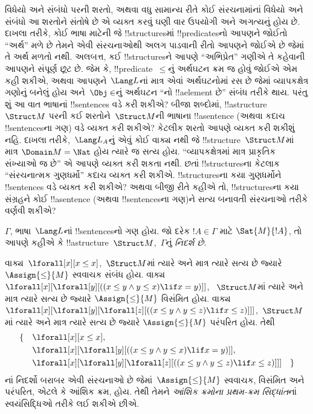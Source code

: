 \documentclass[../../../include/open-logic-section]{subfiles}
\begin{document}


\begin{explain}
વિધેયો અને સંબંધો પરની શરતો, અથવા વધુ સામાન્ય રીતે કોઈ સંરચનામાંનાં
વિધેયો અને સંબંધો આ શરતોને સંતોષે છે એ વ્યક્ત કરવું ઘણી વાર ઉપયોગી અને
અગત્યનું હોય છે. દાખલા તરીકે, કોઈ ભાષા માટેની જે !!{structure}sમાં
!!{predicate}sનો આપણને જોઈતો ``અર્થ'' મળે છે તેમને એવી
સંરચનાઓથી અલગ પાડવાની રીતો આપણને જોઈએ છે જેમાં તે અર્થ મળતો
નથી. અલબત્ત, કઈ !!{structure}sને આપણે ``અભિપ્રેત'' ગણીએ તે કહેવાની
આપણને સંપૂર્ણ છૂટ છે. જેમ કે, !!{predicate}~$\le$નું અર્થઘટન ક્રમ જ
હોવું જોઈએ એમ કહી શકીએ, અથવા આપણને~$\Lang L$નાં માત્ર એવાં અર્થઘટનોમાં
રસ છે જેમાં વ્યાપકક્ષેત્ર ગણોનું બનેલું હોય અને~$\Obj \in$નું
અર્થઘટન ``નો !!a{element} છે'' સંબંધ તરીકે થાય. પરંતુ શું આ વાત ભાષાનાં
!!{sentence}s વડે કરી શકીએ? બીજા શબ્દોમાં, !!a{structure}~$\Struct M$
પરની કઈ શરતોને~$\Struct M$ની ભાષાના !!a{sentence} (અથવા કદાચ
!!{sentence}sના ગણ) વડે વ્યક્ત કરી શકીએ? કેટલીક શરતો આપણે વ્યક્ત કરી
શકીશું નહિ. દાખલા તરીકે,~$\Lang L_A$નું એવું કોઈ વાક્ય નથી જે
!!{structure}~$\Struct M$માં માત્ર $\Domain M=\Nat$ હોય ત્યારે જ સત્ય
હોય. ``વ્યાપકક્ષેત્રમાં માત્ર પ્રાકૃતિક સંખ્યાઓ જ છે'' એ આપણે વ્યક્ત
કરી શકતા નથી. છતાં !!{structure}sના કેટલાક ``સંરચનાત્મક ગુણધર્મો''
કદાચ વ્યક્ત કરી શકીએ. !!{structure}sના કયા ગુણધર્મોને !!{sentence}s
વડે વ્યક્ત કરી શકીએ? અથવા બીજી રીતે કહીએ તો, !!{structure}sના કયા
સંગ્રહને કોઈ !!a{sentence} (અથવા !!{sentence}sના ગણ)ને સત્ય બનાવતી
સંરચનાઓ તરીકે વર્ણવી શકીએ?
\end{explain}

\begin{defn}[ગણનું નિદર્શ]
$\Gamma$, ભાષા~$\Lang L$નાં !!{sentence}sનો ગણ હોય. જો દરેક
$!A\in\Gamma$ માટે $\Sat{M}{!A}$, તો આપણે કહીએ કે
!!a{structure}~$\Struct M$,~$\Gamma$નું \emph{નિદર્શ છે}.
\end{defn}

\begin{ex}
વાક્ય~$\lforall[x][x \le x]$,~$\Struct M$માં ત્યારે અને માત્ર ત્યારે
સત્ય છે જ્યારે $\Assign{\le}{M}$ સ્વવાચક સંબંધ હોય. વાક્ય
$\lforall[x][\lforall[y][((x \le y \land y \le x) \lif x = y)]]$,
~$\Struct M$માં ત્યારે અને માત્ર ત્યારે સત્ય છે જ્યારે
$\Assign{\le}{M}$ વિસંમિત હોય. વાક્ય
$\lforall[x][\lforall[y][\lforall[z][((x \le y \land y \le z)
      \lif x \le z)]]]$,~$\Struct M$માં ત્યારે અને માત્ર ત્યારે સત્ય
છે જ્યારે $\Assign{\le}{M}$ પરંપરિત હોય. તેથી
\begin{align*}
\{\quad &\lforall[x][x \le x], \\
   & \lforall[x][\lforall[y][((x \le y \land y \le
    x) \lif x = y)]], \\
   &\lforall[x][\lforall[y][\lforall[z][((x \le y
      \land y \le z) \lif x \le z)]]] \quad \}
\end{align*}
નાં નિદર્શો બરાબર એવી સંરચનાઓ છે જેમાં~$\Assign{\le}{M}$ સ્વવાચક,
વિસંમિત અને પરંપરિત, એટલે કે આંશિક ક્રમ, હોય. તેથી તેમને
\emph{આંશિક ક્રમોના પ્રથમ-ક્રમ સિદ્ધાંત}નાં સ્વયંસિદ્ધિઓ તરીકે લઈ
શકીએ છીએ.
\end{ex}
\end{document}
